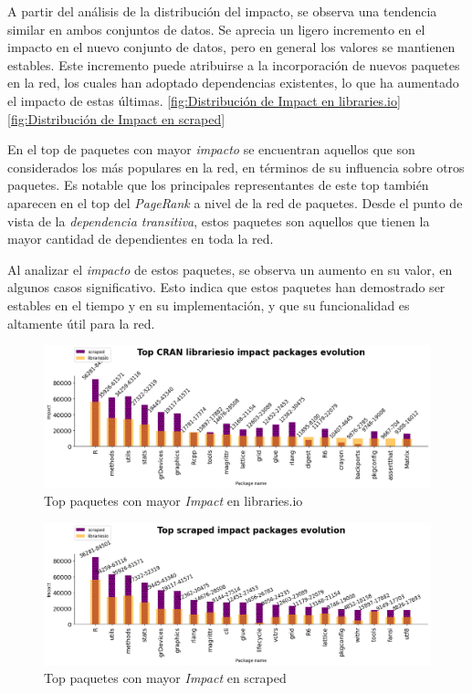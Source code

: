 A partir del análisis de la distribución del impacto, se observa una tendencia similar en ambos
conjuntos de datos. Se aprecia un ligero incremento en el impacto en el nuevo conjunto de datos,
pero en general los valores se mantienen estables. Este incremento puede atribuirse a la incorporación
de nuevos paquetes en la red, los cuales han adoptado dependencias existentes, lo que ha aumentado el
impacto de estas últimas. \ref{fig:Distribución de Impact en libraries.io} \ref{fig:Distribución de Impact en scraped}


En el top de paquetes con mayor \textit{impacto} se encuentran aquellos que son considerados los más populares
en la red, en términos de su influencia sobre otros paquetes. Es notable que los principales representantes
de este top también aparecen en el top del \textit{PageRank} a nivel de la red de paquetes. Desde el punto
de vista de la \textit{dependencia transitiva}, estos paquetes son aquellos que tienen la mayor cantidad de
dependientes en toda la red.

Al analizar el \textit{impacto} de estos paquetes, se observa un aumento en su valor, en algunos casos
significativo. Esto indica que estos paquetes han demostrado ser estables en el tiempo y en su implementación,
y que su funcionalidad es altamente útil para la red.

\begin{figure}[h!]
    \begin{center}
        \includegraphics[width=1\textwidth]{img/cran/impact_top_libio.png}
        \caption{Top paquetes con mayor \textit{Impact} en libraries.io}
        \label{fig:Top impact libraries.io}
    \end{center}
\end{figure}

\begin{figure}[h!]
    \begin{center}
        \includegraphics[width=1\textwidth]{img/cran/impact_top_scraped.png}
        \caption{Top paquetes con mayor \textit{Impact} en scraped}
        \label{fig:Top impact scraped}
    \end{center}
\end{figure}

